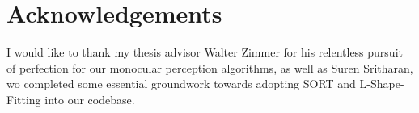 
\chapter{Acknowledgements}
\label{ch:ack}

I would like to thank my thesis advisor Walter Zimmer for his relentless pursuit of perfection for our monocular perception algorithms, as well as Suren Sritharan, wo completed some essential groundwork towards adopting SORT and L-Shape-Fitting into our codebase.
